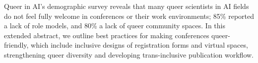 Queer in AI's demographic survey reveals that many queer scientists in AI fields do not feel fully welcome in conferences or their work environments; 85\% reported a lack of role models, and 80\% a lack of queer community spaces. In this extended abstract, we outline best practices for making conferences queer-friendly, which include inclusive designs of registration forms and virtual spaces, strengthening queer diversity and developing trans-inclusive publication workflow.
